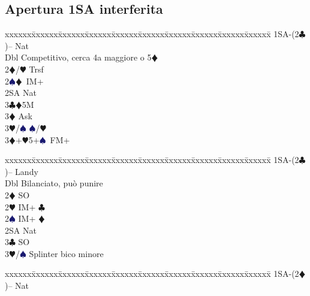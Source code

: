 \documentclass[a4paper,italian]{article}
\newcommand{\BC}{\textcolor{OliveGreen}{$\clubsuit$}}
\newcommand{\BD}{\textcolor{RedOrange}{$\vardiamondsuit$}}
\newcommand{\BH}{\textcolor{Red2}{$\varheartsuit${}}}
\newcommand{\BS}{\textcolor{MidnightBlue}{$\spadesuit${}}}
\newenvironment{bidtable}
{\begin{tabbing}

    xxxxxx\=xxxxxx\=xxxxxx\=xxxxxx\=xxxxxx\=xxxxxx\=xxxxxx\=xxxxxx\=xxxxxx\=xxxxxx\=\kill}
{\end{tabbing} }%
\begin{document}
                                    \begin{multicols}{2}
                                        \subsection{Apertura 1SA interferita}

                                        \begin{bidtable}
                                            1SA-(2\BC)-- \> \> Nat\+\\
                                            Dbl \> Competitivo, cerca 4a maggiore o 5\BD \\
                                            2\BD/\BH \> Trsf\\
                                            2\BS {}\BD\ IM+\\
                                            2SA \> Nat\\
                                            3\BC {}\BD 5M\+\\
                                            3\BD \> Ask\+\\
                                            3\BH/\BS \> \BS /\BH \-\-\\
                                            3\BD {}+\BH 5+\BS\ FM+\-
                                        \end{bidtable}
                                        \begin{bidtable}
                                            1SA-(2\BC)-- \>\> Landy\+\\
                                            Dbl \> Bilanciato, può punire\\
                                            2\BD \> SO\\
                                            2\BH \> IM+ \BC \\
                                            2\BS \> IM+ \BD \\
                                            2SA \> Nat\\
                                            3\BC \> SO\\
                                            3\BH/\BS \> Splinter bico minore\-
                                        \end{bidtable}
                                        \begin{bidtable}
                                            1SA-(2\BD)-- \>\> Nat\+\\

\end{bidtable}
\end{multicols}
\end{document}
